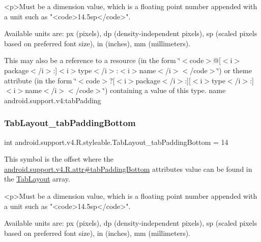 \begin{DoxyVerb}      <p>Must be a dimension value, which is a floating point number appended with a unit such as "<code>14.5sp</code>".
\end{DoxyVerb}
 Available units are\+: px (pixels), dp (density-\/independent pixels), sp (scaled pixels based on preferred font size), in (inches), mm (millimeters). 

This may also be a reference to a resource (in the form \char`\"{}$<$code$>$@\mbox{[}$<$i$>$package$<$/i$>$\+:\mbox{]}$<$i$>$type$<$/i$>$\+:$<$i$>$name$<$/i$>$$<$/code$>$\char`\"{}) or theme attribute (in the form \char`\"{}$<$code$>$?\mbox{[}$<$i$>$package$<$/i$>$\+:\mbox{]}\mbox{[}$<$i$>$type$<$/i$>$\+:\mbox{]}$<$i$>$name$<$/i$>$$<$/code$>$\char`\"{}) containing a value of this type.  name android.\+support.\+v4\+:tab\+Padding \mbox{\label{classandroid_1_1support_1_1v4_1_1R_1_1styleable_a9cf94d20ae7b1d2855d68fb86f6d2af0}} 
\subsubsection{\texorpdfstring{Tab\+Layout\+\_\+tab\+Padding\+Bottom}{TabLayout\_tabPaddingBottom}}
{\footnotesize\ttfamily int android.\+support.\+v4.\+R.\+styleable.\+Tab\+Layout\+\_\+tab\+Padding\+Bottom = 14\hspace{0.3cm}{\ttfamily [static]}}

This symbol is the offset where the \hyperlink{classandroid_1_1support_1_1v4_1_1R_1_1attr_a53cfe2100a0ac56209ac806c16b017d1}{android.\+support.\+v4.\+R.\+attr\#tab\+Padding\+Bottom} attribute\textquotesingle{}s value can be found in the \hyperlink{classandroid_1_1support_1_1v4_1_1R_1_1styleable_a48e866d7121b40ef0bb3d467759606a9}{Tab\+Layout} array.

\begin{DoxyVerb}      <p>Must be a dimension value, which is a floating point number appended with a unit such as "<code>14.5sp</code>".
\end{DoxyVerb}
 Available units are\+: px (pixels), dp (density-\/independent pixels), sp (scaled pixels based on preferred font size), in (inches), mm (millimeters). 

